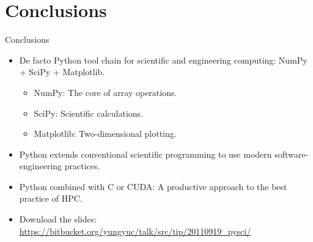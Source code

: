 \documentclass[dvips,xcolor=pst]{beamer}
\begin{document}
\section{Conclusions}

\begin{frame}{
%
Conclusions
%
}
\begin{itemize} \large
  \item De facto Python tool chain for scientific and engineering computing:
  NumPy + SciPy + Matplotlib.
  \begin{itemize} \large
    \item NumPy: The core of array operations.
    \item SciPy: Scientific calculations.
    \item Matplotlib: Two-dimensional plotting.
  \end{itemize}
  \item Python extends conventional scientific programming to use modern
  software-engineering practices.
  \item Python combined with C or CUDA: A productive approach to the best
  practice of HPC.
  \item Download the slides:
  {\small\url{https://bitbucket.org/yungyuc/talk/src/tip/20110919_pysci/}}
\end{itemize}
\end{frame}
\end{document}
